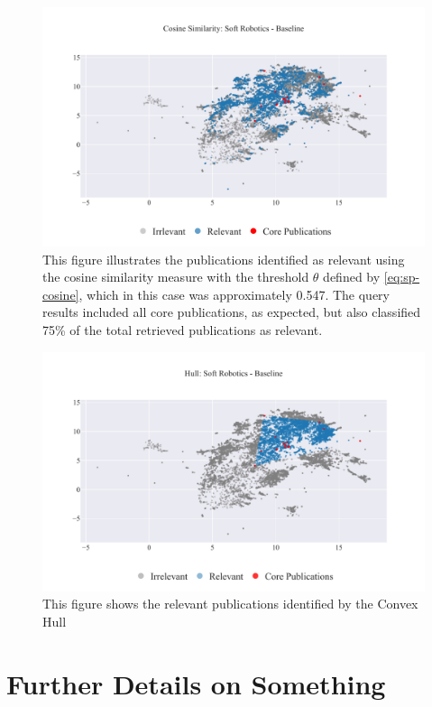 \documentclass[%
  a4paper,fontsize=11pt,abstract=on,%
  oneside,BCOR=19mm,%
]{scrreprt}
\begin{document}
\begin{figure}[!h]
	\centering	
	\includegraphics[scale=0.7]{pics/sr-cosine-baseline.pdf}
	\caption[Semantic Cosine Similarity: Soft Robotics]{This figure illustrates the publications identified as relevant using the cosine similarity measure with the threshold $\theta$ defined by \autoref{eq:sp-cosine}, which in this case was approximately 0.547. The query results included all core publications, as expected, but also classified 75\% of the total retrieved publications as relevant.}\label{fig:sr-cosine-baseline}
\end{figure}

\begin{figure}
	\centering	
	\includegraphics[scale=0.7]{pics/sr-hull-baseline.pdf}
	\caption[Semantic Cosine Threshold: Empirical Analysis]{This figure shows the relevant publications identified by the Convex Hull}\label{fig:sr-hull-baseline}
\end{figure}




\section{Further Details on Something}

\printbibliography


\end{document}
